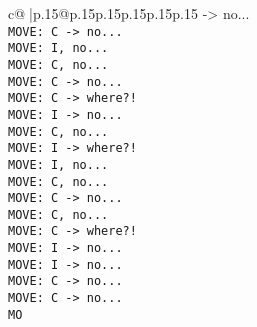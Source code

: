 \documentclass{article}
\begin{document}
{\begin{supertabular}{c@{$\;$}|p{.15\linewidth}@{}p{.15\linewidth}p{.15\linewidth}p{.15\linewidth}p{.15\linewidth}p{.15\linewidth}}
{{{ -> no...\\ \tt  MOVE: C -> no...\\ \tt  MOVE: I, no...\\ \tt  MOVE: C, no...\\ \tt  MOVE: C -> no...\\ \tt  MOVE: C -> where?!\\ \tt  MOVE: I -> no...\\ \tt  MOVE: C, no...\\ \tt  MOVE: I -> where?!\\ \tt  MOVE: I, no...\\ \tt  MOVE: C, no...\\ \tt  MOVE: C -> no...\\ \tt  MOVE: C, no...\\ \tt  MOVE: C -> where?!\\ \tt  MOVE: I -> no...\\ \tt  MOVE: I -> no...\\ \tt  MOVE: C -> no...\\ \tt  MOVE: C -> no...\\ \tt  MO}}}
\end{supertabular}}
\end{document}
